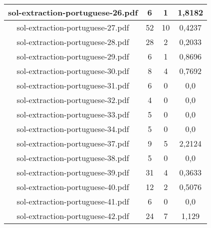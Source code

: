 \documentclass[11pt]{article}
\newlength\mylength
\begin{document}
\begin{center}
\begin{longtable}{||C{.40\mylength}||C{.30\mylength}||C{.30\mylength}||C{.30\mylength}||}
  sol-extraction-portuguese-26.pdf & 6 & 1 & 1,8182 \\  \hline
  sol-extraction-portuguese-27.pdf & 52 & 10 & 0,4237 \\  \hline
  sol-extraction-portuguese-28.pdf & 28 & 2 & 0,2033 \\  \hline
  sol-extraction-portuguese-29.pdf & 6 & 1 & 0,8696 \\  \hline
  sol-extraction-portuguese-30.pdf & 8 & 4 & 0,7692 \\  \hline
  sol-extraction-portuguese-31.pdf & 6 & 0 & 0,0 \\  \hline
  sol-extraction-portuguese-32.pdf & 4 & 0 & 0,0 \\  \hline
  sol-extraction-portuguese-33.pdf & 5 & 0 & 0,0 \\  \hline
  sol-extraction-portuguese-34.pdf & 5 & 0 & 0,0 \\  \hline
  sol-extraction-portuguese-37.pdf & 9 & 5 & 2,2124 \\  \hline
  sol-extraction-portuguese-38.pdf & 5 & 0 & 0,0 \\  \hline
  sol-extraction-portuguese-39.pdf & 31 & 4 & 0,3633 \\  \hline
  sol-extraction-portuguese-40.pdf & 12 & 2 & 0,5076 \\  \hline
  sol-extraction-portuguese-41.pdf & 6 & 0 & 0,0 \\  \hline
  sol-extraction-portuguese-42.pdf & 24 & 7 & 1,129 \\  \hline

\end{longtable}
\end{center}
\end{document}
